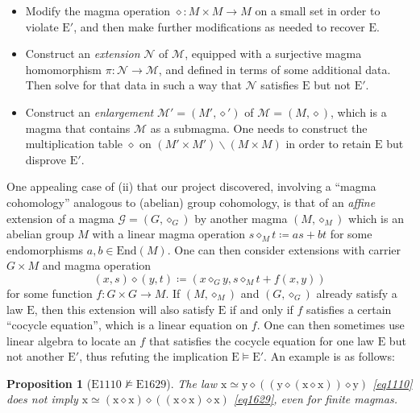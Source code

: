 \documentclass[12pt]{amsart}
\newtheorem{proposition}[theorem]{Proposition}
\theoremstyle{definition}
\newcommand{\x}{\mathrm{x}}
\newcommand{\y}{\mathrm{y}}
\newcommand{\op}{\diamond}
\newcommand{\formaleq}{\simeq}
\newcommand{\nmodels}{\not\models}
\newcommand{\Magma}{{\mathcal{M}}}
\newcommand{\MagmaN}{{\mathcal{N}}}
\newcommand{\Eq}[1]{\mathrm{E}#1}
\newcommand{\E}{\mathrm{E}}
\begin{document}
\begin{itemize}
  \item[(i)]  Modify the magma operation $\op \colon M \times M \to M$ on a small set in order to violate ${\E'}$, and then make further modifications as needed to recover $\E$.
  \item[(ii)]  Construct an \emph{extension} $\MagmaN$ of $\Magma$, equipped with a surjective magma homomorphism $\pi: \MagmaN \to \Magma$, and defined in terms of some additional data.  Then solve for that data in such a way that $\MagmaN$ satisfies $\E$ but not ${\E'}$.
  \item[(iii)]  Construct an \emph{enlargement} $\Magma' = (M',\op')$ of $\Magma = (M,\op)$, which is a magma that contains $\Magma$ as a submagma.  One needs to construct the multiplication table $\op$ on $(M' \times M') \backslash (M \times M)$ in order to retain $\E$ but disprove ${\E'}$.
\end{itemize}

One appealing case of (ii) that our project discovered, involving a ``magma cohomology'' analogous to (abelian) group cohomology, is that of an \emph{affine} extension of a magma ${\mathcal G} = (G,\op_G)$ by another magma $(M,\op_M)$ which is an abelian group $M$ with a linear magma operation $s \op_M t \coloneqq as + bt$ for some endomorphisms $a,b \in \mathrm{End}(M)$.  One can then consider extensions with carrier $G \times M$ and magma operation
\begin{equation}\label{xsyt}
 (x, s) \op (y, t) \coloneqq (x \op_G y, s \op_M t + f(x,y))
\end{equation}
for some function $f \colon G \times G \to M$.  If $(M,\op_M)$ and $(G,\op_G)$ already satisfy a law $\E$, then this extension will also satisfy $\E$ if and only if $f$ satisfies a certain ``cocycle equation'', which is a linear equation on $f$.  One can then sometimes use linear algebra to locate an $f$ that satisfies the cocycle equation for one law $\E$ but not another ${\E'}$, thus refuting the implication $\E \models {\E'}$.  An example is as follows:

\begin{proposition}[$\Eq{1110} \nmodels \Eq{1629}$]\label{1110-1629} The law $\x \formaleq \y \op ((\y \op (\x \op \x)) \op \y)$ \eqref{eq1110} does not imply $\x \formaleq (\x \op \x) \op ((\x \op \x) \op \x)$ \eqref{eq1629}, even for finite magmas.
\end{proposition}
\end{document}
